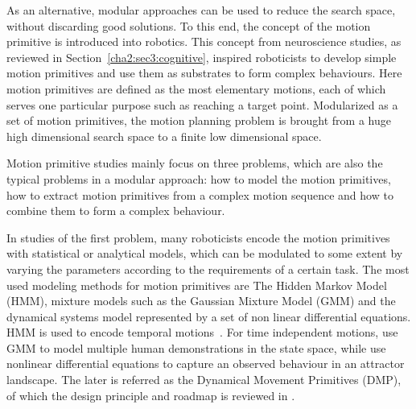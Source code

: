 As an alternative, modular approaches can be used to reduce the search space, without discarding good solutions. To this end, the concept of the motion primitive is introduced into robotics. 
This concept from neuroscience studies, as reviewed in Section~\ref{cha2:sec3:cognitive}, inspired roboticists to develop simple motion primitives and use them as substrates to form complex behaviours. Here motion primitives are defined as the most elementary motions, each of which serves one particular purpose such as reaching a target point. Modularized as a set of motion primitives, the motion planning problem is brought from a huge high dimensional search space to a finite low dimensional space.

 


Motion primitive studies mainly focus on three problems, which are also the typical problems in a modular approach: how to model the motion primitives, how to extract motion primitives from a complex motion sequence and how to combine them to form a complex behaviour.


In studies of the first problem, many roboticists encode the motion primitives with statistical or analytical models, which can be modulated to some extent by varying the parameters according to the requirements of a certain task. The most used modeling methods for motion primitives are The Hidden Markov Model (HMM), mixture models such as the Gaussian Mixture Model (GMM) and the dynamical systems model represented by a set of non linear differential equations. HMM is used to encode temporal motions~\citep{inamura2004embodied,kulic2008incremental,takano2008integrating,lee2010incremental,bidan2013robio}. For time independent motions, \citet{gribovskaya2010learning,khansari2010imitation} use GMM to model multiple human demonstrations in the state space, while \citet{ijspeert2002movement,Ijspeert2003attractor,schaal2005learning,peters2008reinforcement} use nonlinear differential equations to capture an observed behaviour in an attractor landscape. The later is referred as the Dynamical Movement Primitives (DMP), of which the design principle and roadmap is reviewed in \citep{ijspeert2013dynamical}.

